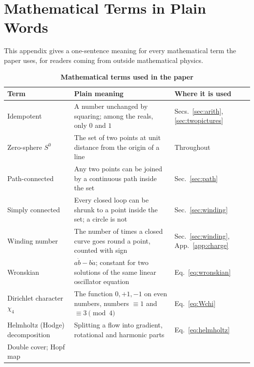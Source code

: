 \documentclass[%
 reprint, amsmath,amssymb, aps, prb, ]{revtex4-2}
\numberwithin{equation}{section}
\begin{document}
\section{Mathematical Terms in Plain Words}
\label{app:glossary}

This appendix gives a one-sentence meaning for every mathematical term the paper uses, for readers coming from outside mathematical physics.

\begin{table}[t!]
\centering
\caption{\textbf{Mathematical terms used in the paper}}
\label{tab:glossary}
\renewcommand{\arraystretch}{1.4}
\begin{tabular}{p{3.2cm}p{8.6cm}p{3.8cm}}
\toprule
\textbf{Term} & \textbf{Plain meaning} & \textbf{Where it is used} \\
\midrule
Idempotent
& A number unchanged by squaring; among the reals, only $0$ and $1$
& Secs.~\ref{sec:arith}, \ref{sec:twopictures} \\
\addlinespace[0.3cm]
Zero-sphere $S^0$
& The set of two points at unit distance from the origin of a line
& Throughout \\
\addlinespace[0.3cm]
Path-connected
& Any two points can be joined by a continuous path inside the set
& Sec.~\ref{sec:path} \\
\addlinespace[0.3cm]
Simply connected
& Every closed loop can be shrunk to a point inside the set; a circle is not
& Sec.~\ref{sec:winding} \\
\addlinespace[0.3cm]
Winding number
& The number of times a closed curve goes round a point, counted with sign
& Sec.~\ref{sec:winding}, App.~\ref{app:charge} \\
\addlinespace[0.3cm]
Wronskian
& $a\dot b-b\dot a$; constant for two solutions of the same linear oscillator equation
& Eq.~\eqref{eq:wronskian} \\
\addlinespace[0.3cm]
Dirichlet character $\chi_4$
& The function $0,+1,-1$ on even numbers, numbers $\equiv1$ and $\equiv3\pmod4$
& Eq.~\eqref{eq:Wchi} \\
\addlinespace[0.3cm]
Helmholtz (Hodge) decomposition
& Splitting a flow into gradient, rotational and harmonic parts
& Eq.~\eqref{eq:helmholtz} \\
\addlinespace[0.3cm]
Double cover; Hopf map

\end{tabular}
\end{table}
\end{document}
